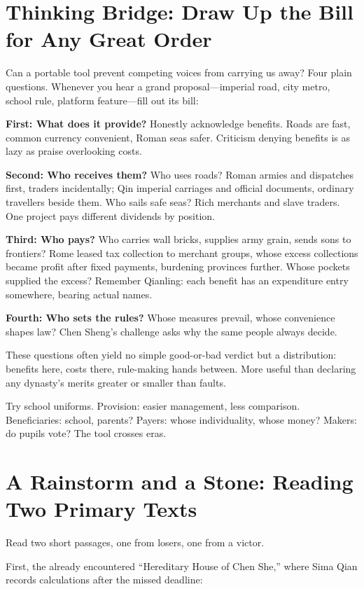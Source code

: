 \section[Thinking Bridge: The Bill for Order]{Thinking Bridge: Draw Up the Bill for Any Great Order}
Can a portable tool prevent competing voices from carrying us away? Four plain questions. Whenever you hear a grand proposal---imperial road, city metro, school rule, platform feature---fill out its bill:

\textbf{First: What does it provide?} Honestly acknowledge benefits. Roads are fast, common currency convenient, Roman seas safer. Criticism denying benefits is as lazy as praise overlooking costs.

\textbf{Second: Who receives them?} Who uses roads? Roman armies and dispatches first, traders incidentally; Qin imperial carriages and official documents, ordinary travellers beside them. Who sails safe seas? Rich merchants and slave traders. One project pays different dividends by position.

\textbf{Third: Who pays?} Who carries wall bricks, supplies army grain, sends sons to frontiers? Rome leased tax collection to merchant groups, whose excess collections became profit after fixed payments, burdening provinces further. Whose pockets supplied the excess? Remember Qianling: each benefit has an expenditure entry somewhere, bearing actual names.

\textbf{Fourth: Who sets the rules?} Whose measures prevail, whose convenience shapes law? Chen Sheng's challenge asks why the same people always decide.

These questions often yield no simple good-or-bad verdict but a distribution: benefits here, costs there, rule-making hands between. More useful than declaring any dynasty's merits greater or smaller than faults.

Try school uniforms. Provision: easier management, less comparison. Beneficiaries: school, parents? Payers: whose individuality, whose money? Makers: do pupils vote? The tool crosses eras.

\section[Rain and Stone: Two Primary Texts]{A Rainstorm and a Stone: Reading Two Primary Texts}
Read two short passages, one from losers, one from a victor.

First, the already encountered ``Hereditary House of Chen She,'' where Sima Qian records calculations after the missed deadline:


